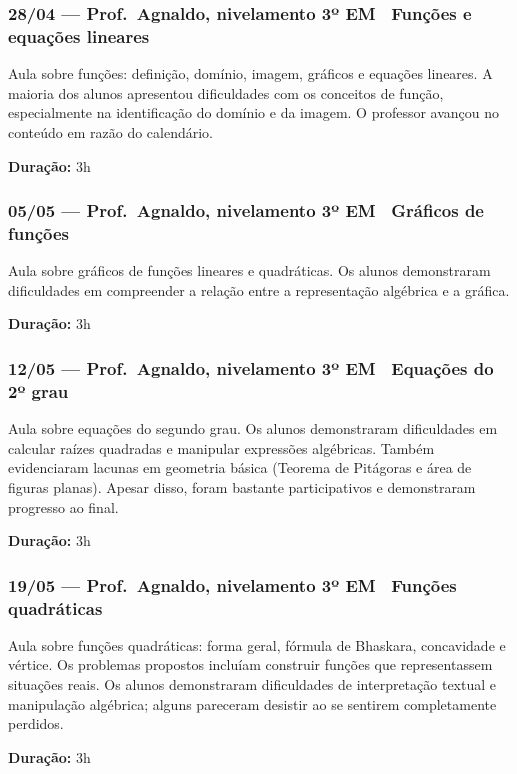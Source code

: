 \documentclass[11pt]{article}
\begin{document}
\subsubsection*{28/04 --- Prof.\ Agnaldo, nivelamento 3º EM \textbar\ Funções e equações lineares}

Aula sobre funções: definição, domínio, imagem, gráficos e equações lineares. A maioria dos alunos apresentou dificuldades com os conceitos de função, especialmente na identificação do domínio e da imagem. O professor avançou no conteúdo em razão do calendário.

\textbf{Duração:} 3h

\subsubsection*{05/05 --- Prof.\ Agnaldo, nivelamento 3º EM \textbar\ Gráficos de funções}

Aula sobre gráficos de funções lineares e quadráticas. Os alunos demonstraram dificuldades em compreender a relação entre a representação algébrica e a gráfica.

\textbf{Duração:} 3h

\subsubsection*{12/05 --- Prof.\ Agnaldo, nivelamento 3º EM \textbar\ Equações do 2º grau}

Aula sobre equações do segundo grau. Os alunos demonstraram dificuldades em calcular raízes quadradas e manipular expressões algébricas. Também evidenciaram lacunas em geometria básica (Teorema de Pitágoras e área de figuras planas). Apesar disso, foram bastante participativos e demonstraram progresso ao final.

\textbf{Duração:} 3h

\subsubsection*{19/05 --- Prof.\ Agnaldo, nivelamento 3º EM \textbar\ Funções quadráticas}

Aula sobre funções quadráticas: forma geral, fórmula de Bhaskara, concavidade e vértice. Os problemas propostos incluíam construir funções que representassem situações reais. Os alunos demonstraram dificuldades de interpretação textual e manipulação algébrica; alguns pareceram desistir ao se sentirem completamente perdidos.

\textbf{Duração:} 3h
\end{document}
